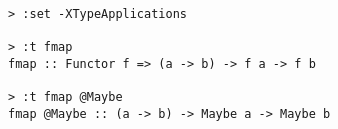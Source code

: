 \begin{repl}\begin{lstlisting}
> :set -XTypeApplications

> :t fmap
fmap :: Functor f => (a -> b) -> f a -> f b

> :t fmap @Maybe
fmap @Maybe :: (a -> b) -> Maybe a -> Maybe b\end{lstlisting}\end{repl}
